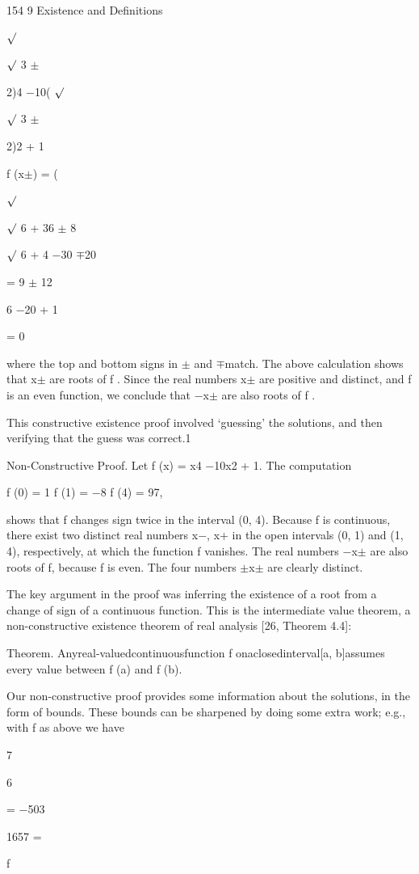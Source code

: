 \documentclass[11pt]{article}
\theoremstyle{plain}
\theoremstyle{definition}
\begin{document}
154 9 Existence and Definitions

$\surd$

$\surd$ 3 $\pm$

2)4 $-$10( $\surd$

$\surd$ 3 $\pm$

2)2 + 1

f (x$\pm$) = (

$\surd$

$\surd$ 6 + 36 $\pm$ 8

$\surd$ 6 + 4 $-$30 $\mp$20

= 9 $\pm$ 12

6 $-$20 + 1

= 0

where the top and bottom signs in $\pm$ and $\mp$match. The above calculation shows that x$\pm$ are roots of f . Since the real numbers x$\pm$ are positive and distinct, and f is an even function, we conclude that $-$x$\pm$ are also roots of f . 

This constructive existence proof involved `guessing' the solutions, and then verifying that the guess was correct.1

Non-Constructive Proof. Let f (x) = x4 $-$10x2 + 1. The computation

f (0) = 1 f (1) = $-$8 f (4) = 97,

shows that f changes sign twice in the interval (0, 4). Because f is continuous, there exist two distinct real numbers x$-$, x+ in the open intervals (0, 1) and (1, 4), respectively, at which the function f vanishes. The real numbers $-$x$\pm$ are also roots of f, because f is even. The four numbers $\pm$x$\pm$ are clearly distinct. 

The key argument in the proof was inferring the existence of a root from a change of sign of a continuous function. This is the intermediate value theorem, a non-constructive existence theorem of real analysis [26, Theorem 4.4]:

Theorem. Anyreal-valuedcontinuousfunction f onaclosedinterval[a, b]assumes every value between f (a) and f (b).

Our non-constructive proof provides some information about the solutions, in the form of bounds. These bounds can be sharpened by doing some extra work; e.g., with f as above we have

7

6

= $-$503

1657 =

f
\end{document}
